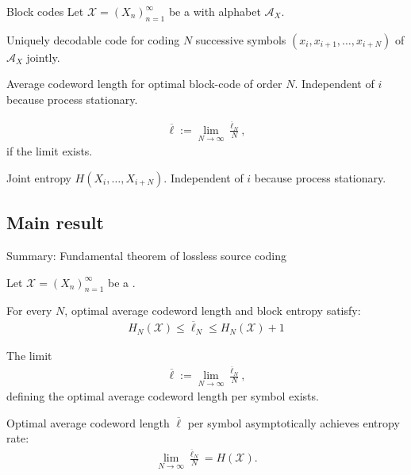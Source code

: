 \begin{frame}{Block codes}
Let $\mathcal{X}=(X_n)_{n=1}^\infty$ be a  with alphabet $\mathcal{A}_X$.  
\bit
\item {} Uniquely decodable code for coding $N$ successive symbols $(x_i,x_{i+1},\dots,x_{i+N})$ of $\mathcal{A}_X$ jointly. 
\eit
\bit
\item {} Average codeword length for optimal block-code of order $N$. Independent of $i$ because 
process stationary. 
\eit
\bit
\item {}
\begin{align*}
\overline{\ell}:=\lim_{N\to\infty}\frac{\overline{\ell}_N}{N},
\end{align*} 
if the limit exists. 
\eit
\bit
\item {} Joint entropy $H(X_{i},\dots,X_{i+N})$. Independent of $i$ because process stationary. 
\eit
\end{frame}

\subsection{Main result}
\begin{frame}{Summary: Fundamental theorem of lossless source coding}
\begin{theorem}
Let $\mathcal{X}=(X_n)_{n=1}^\infty$ be a . 
\bit
\item For every $N$, optimal average codeword length and block entropy satisfy:
\begin{align*}
H_N(\mathcal{X})\leq\overline{\ell}_N\leq H_N(\mathcal{X})+1
\end{align*}
\item The limit 
\begin{align*}
\overline{\ell}:=\lim_{N\to\infty}\frac{\overline{\ell}_N}{N},
\end{align*} 
defining the optimal average codeword length per symbol exists.
\item Optimal average codeword length $\overline{\ell}$ per symbol asymptotically achieves entropy rate:
\begin{align*}
\lim_{N\to\infty}\frac{\overline{\ell}_N}{N}=H(\mathcal{X}).
\end{align*}
\eit
\end{theorem}

\end{frame}




